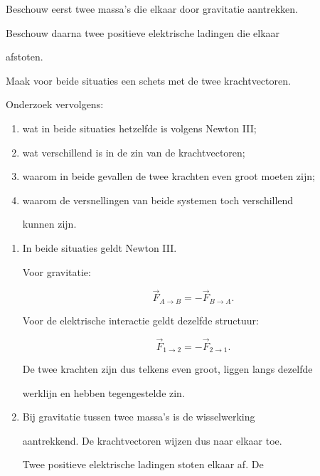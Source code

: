 \documentclass{ximera}
\begin{document}
\begin{oefening}{\oefG}

Beschouw eerst twee massa's die elkaar door gravitatie aantrekken.

Beschouw daarna twee positieve elektrische ladingen die elkaar

afstoten.

Maak voor beide situaties een schets met de twee krachtvectoren.

Onderzoek vervolgens:

\begin{enumerate}

 \item wat in beide situaties hetzelfde is volgens Newton III;

 \item wat verschillend is in de zin van de krachtvectoren;

 \item waarom in beide gevallen de twee krachten even groot moeten zijn;

 \item waarom de versnellingen van beide systemen toch verschillend

    kunnen zijn.

\end{enumerate}


\begin{oplossing}

\begin{enumerate}

  \item In beide situaties geldt Newton III.

  Voor gravitatie:

  \[\vec F_{A\rightarrow B} = -\vec F_{B\rightarrow A}.\]

  Voor de elektrische interactie geldt dezelfde structuur:

  \[\vec F_{1\rightarrow2} = -\vec F_{2\rightarrow1}.\]

  De twee krachten zijn dus telkens even groot, liggen langs dezelfde

  werklijn en hebben tegengestelde zin.

  \item Bij gravitatie tussen twee massa's is de wisselwerking

  aantrekkend. De krachtvectoren wijzen dus naar elkaar toe.

  Twee positieve elektrische ladingen stoten elkaar af. De


\end{enumerate}
\end{oplossing}
\end{oefening}
\end{document}
